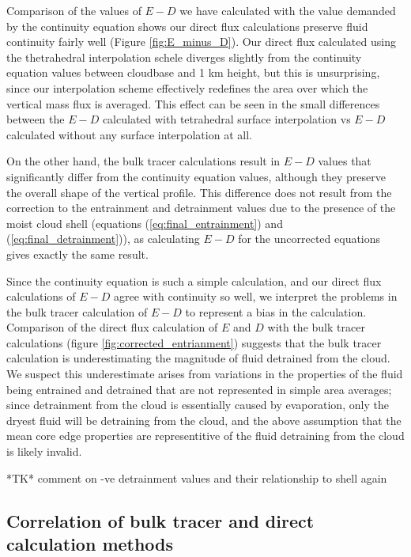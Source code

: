 \documentclass[12pt]{article}
\begin{document}
Comparison of the values of $E-D$ we have calculated with the value demanded by 
the continuity equation shows our direct flux calculations preserve fluid 
continuity fairly well (Figure \ref{fig:E_minus_D}).  Our direct flux 
calculated using the thetrahedral interpolation schele diverges slightly from
the continuity equation values between cloudbase and 1 km height, but this is
unsurprising, since our interpolation scheme effectively redefines the area
over which the vertical mass flux is averaged.  This effect can be seen in the 
small differences between the $E-D$ calculated with tetrahedral surface
interpolation vs $E-D$ calculated without any surface interpolation at all.

On the other hand, the bulk tracer calculations result in $E-D$ values that
significantly differ from the continuity equation values, although they 
preserve the overall shape of the vertical profile.  This difference does not 
result from the correction to the entrainment and detrainment values due to
the presence of the moist cloud shell (equations (\ref{eq:final_entrainment}) 
and (\ref{eq:final_detrainment})), as calculating $E-D$ for the uncorrected 
equations gives exactly the same result.

Since the continuity equation is such a simple calculation, and our direct flux 
calculations of $E-D$ agree with continuity so well, we interpret the problems 
in the bulk tracer calculation of $E-D$ to represent a bias in the calculation. 
Comparison of the direct flux calculation of $E$ and $D$ with the bulk tracer 
calculations (figure \ref{fig:corrected_entrianment}) suggests that the bulk 
tracer calculation is underestimating the magnitude of fluid detrained from 
the cloud.  We suspect this underestimate arises from variations in the 
properties of the fluid being entrained and detrained that are not represented 
in simple area averages; since detrainment from the cloud is essentially caused 
by evaporation, only the dryest fluid will be detraining from the cloud, and 
the above assumption that the mean core edge properties are representitive of 
the fluid detraining from the cloud is likely invalid.

*TK* comment on -ve detrainment values and their relationship to shell again



\subsection{Correlation of bulk tracer and direct calculation methods}
\end{document}
